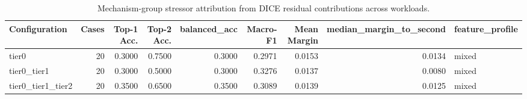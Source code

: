 \begin{table}[t]
\centering
\caption{Mechanism-group stressor attribution from DICE residual contributions across workloads.}
\label{tab:dice_stressor_diagnosis}
\footnotesize
\begin{tabular}{lrrrrrrrl}
\toprule
Configuration & Cases & Top-1 Acc. & Top-2 Acc. & balanced_acc & Macro-F1 & Mean Margin & median_margin_to_second & feature_profile \\
\midrule
tier0 & 20 & 0.3000 & 0.7500 & 0.3000 & 0.2971 & 0.0153 & 0.0134 & mixed \\
tier0_tier1 & 20 & 0.3000 & 0.5000 & 0.3000 & 0.3276 & 0.0137 & 0.0080 & mixed \\
tier0_tier1_tier2 & 20 & 0.3500 & 0.6500 & 0.3500 & 0.3089 & 0.0139 & 0.0125 & mixed \\
\bottomrule
\end{tabular}

\end{table}

